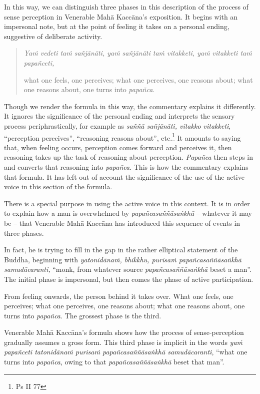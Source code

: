 In this way, we can distinguish three phases in this description of the process of sense perception in Venerable Mahā Kaccāna's exposition. It begins with an impersonal note, but at the point of feeling it takes on a personal ending, suggestive of deliberate activity.

\begin{quote}
\emph{Yaṁ vedeti taṁ sañjānāti, yaṁ sañjānāti taṁ vitakketi, yaṁ vitakketi taṁ papañceti,}

what one feels, one perceives; what one perceives, one reasons about; what one reasons about, one turns into \emph{papañca}.
\end{quote}

Though we render the formula in this way, the commentary explains it differently. It ignores the significance of the personal ending and interprets the sensory process periphrastically, for example as \emph{saññā sañjānāti, vitakko vitakketi}, ``perception perceives'', ``reasoning reasons about'', etc.\footnote{Ps II 77} It amounts to saying that, when feeling occurs, perception comes forward and perceives it, then reasoning takes up the task of reasoning about perception. \emph{Papañca} then steps in and converts that reasoning into \emph{papañca}. This is how the commentary explains that formula. It has left out of account the significance of the use of the active voice in this section of the formula.

There is a special purpose in using the active voice in this context. It is in order to explain how a man is overwhelmed by \emph{papañcasaññāsaṅkhā} -- whatever it may be -- that Venerable Mahā Kaccāna has introduced this sequence of events in three phases.

In fact, he is trying to fill in the gap in the rather elliptical statement of the Buddha, beginning with \emph{yatonidānaṁ, bhikkhu, purisaṁ papañcasaññāsaṅkhā samudācaranti,} ``monk, from whatever source \emph{papañcasaññāsaṅkhā} beset a man''. The initial phase is impersonal, but then comes the phase of active participation.

From feeling onwards, the person behind it takes over. What one feels, one perceives; what one perceives, one reasons about; what one reasons about, one turns into \emph{papañca}. The grossest phase is the third.

Venerable Mahā Kaccāna's formula shows how the process of sense-perception gradually assumes a gross form. This third phase is implicit in the words \emph{yaṁ papañceti tatonidānaṁ purisaṁ papañcasaññāsaṅkhā samudācaranti}, ``what one turns into \emph{papañca}, owing to that \emph{papañcasaññāsaṅkhā} beset that man''.

